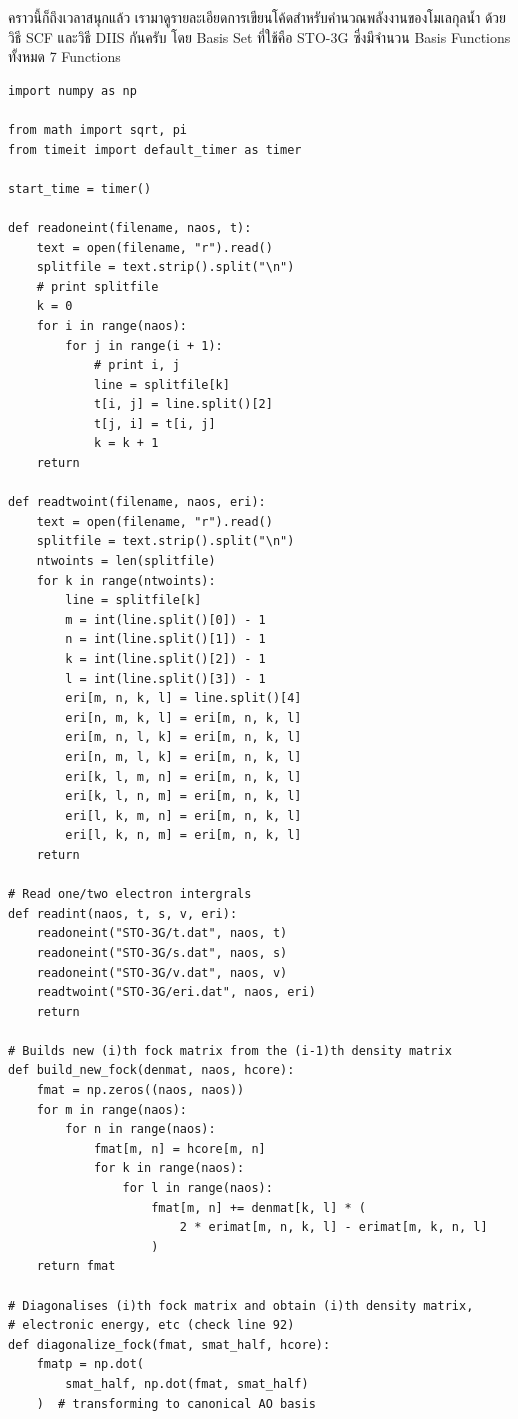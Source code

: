คราวนี้ก็ถึงเวลาสนุกแล้ว เรามาดูรายละเอียดการเขียนโค้ดสำหรับคำนวณพลังงานของโมเลกุลน้ำ  ด้วยวิธี SCF และวิธี DIIS กันครับ โดย Basis Set ที่ใช้คือ STO-3G ซึ่งมีจำนวน Basis Functions ทั้งหมด 7 Functions

\vspace{5pt}

\begin{lstlisting}[style=MyPython]
import numpy as np

from math import sqrt, pi
from timeit import default_timer as timer

start_time = timer()

def readoneint(filename, naos, t):
    text = open(filename, "r").read()
    splitfile = text.strip().split("\n")
    # print splitfile
    k = 0
    for i in range(naos):
        for j in range(i + 1):
            # print i, j
            line = splitfile[k]
            t[i, j] = line.split()[2]
            t[j, i] = t[i, j]
            k = k + 1
    return

def readtwoint(filename, naos, eri):
    text = open(filename, "r").read()
    splitfile = text.strip().split("\n")
    ntwoints = len(splitfile)
    for k in range(ntwoints):
        line = splitfile[k]
        m = int(line.split()[0]) - 1
        n = int(line.split()[1]) - 1
        k = int(line.split()[2]) - 1
        l = int(line.split()[3]) - 1
        eri[m, n, k, l] = line.split()[4]
        eri[n, m, k, l] = eri[m, n, k, l]
        eri[m, n, l, k] = eri[m, n, k, l]
        eri[n, m, l, k] = eri[m, n, k, l]
        eri[k, l, m, n] = eri[m, n, k, l]
        eri[k, l, n, m] = eri[m, n, k, l]
        eri[l, k, m, n] = eri[m, n, k, l]
        eri[l, k, n, m] = eri[m, n, k, l]
    return

# Read one/two electron intergrals
def readint(naos, t, s, v, eri):
    readoneint("STO-3G/t.dat", naos, t)
    readoneint("STO-3G/s.dat", naos, s)
    readoneint("STO-3G/v.dat", naos, v)
    readtwoint("STO-3G/eri.dat", naos, eri)
    return

# Builds new (i)th fock matrix from the (i-1)th density matrix
def build_new_fock(denmat, naos, hcore):
    fmat = np.zeros((naos, naos))
    for m in range(naos):
        for n in range(naos):
            fmat[m, n] = hcore[m, n]
            for k in range(naos):
                for l in range(naos):
                    fmat[m, n] += denmat[k, l] * (
                        2 * erimat[m, n, k, l] - erimat[m, k, n, l]
                    )
    return fmat

# Diagonalises (i)th fock matrix and obtain (i)th density matrix,
# electronic energy, etc (check line 92)
def diagonalize_fock(fmat, smat_half, hcore):
    fmatp = np.dot(
        smat_half, np.dot(fmat, smat_half)
    )  # transforming to canonical AO basis


\end{lstlisting}
